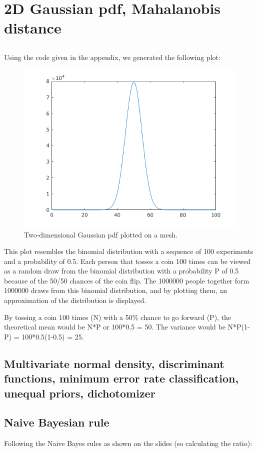 \documentclass[10pt]{article}
\begin{document}
\section{2D Gaussian pdf, Mahalanobis distance}
\subsection{}
Using the code given in the appendix, we generated the following plot:
\begin{figure}[H]
 \centering
 \includegraphics[width=.7\textwidth]{Ass4.png}
 \caption{Two-dimensional Gaussian pdf plotted on a mesh.}
 \label{4}
\end{figure}

This plot resembles the binomial distribution with a sequence of 100 experiments and a probability of 0.5. 
Each person that tosses a coin 100 times can be viewed as a random draw
from the binomial distribution with a probability P of 0.5 because of the 50/50 chances of the coin flip.
The 1000000 people together form 1000000 draws from this binomial
distribution, and by plotting them, an approximation of the distribution
is displayed.

By tossing a coin 100 times (N) with a 50\% chance to go forward (P),
the theoretical mean would be N*P or 100*0.5 = 50.
The variance would be N*P(1-P) = 100*0.5(1-0.5) = 25.

\subsection{Multivariate normal density, discriminant functions, minimum error rate classification, unequal priors, dichotomizer}



\subsection{Naive Bayesian rule}
Following the Naive Bayes rules as shown on the slides (so calculating the ratio):
\end{document}
